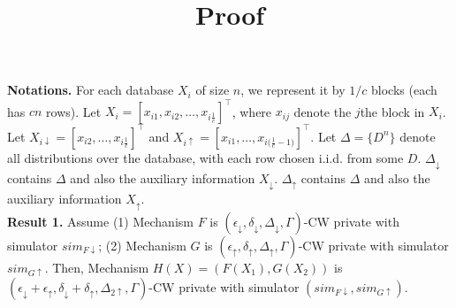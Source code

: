 \documentclass[11pt]{article}
\title{Proof}
\date{}
\begin{document}
\maketitle

{\bf Notations.} For each database $X_{i}$ of size $n$, we represent it by $1/c$ blocks (each has $cn$ rows). Let $X_{i}= [x_{i1},x_{i2}, \dots , x_{i \frac{1}{c}}]^{\top}$, where $x_{ij}$ denote the $j$the block in $X_{i}$. Let $X_{i \downarrow} = [x_{i2}, \dots , x_{i \frac{1}{c}}]^{\top}$ and $X_{i \uparrow} = [x_{i1}, \dots , x_{i {(\frac{1}{c}}-1)}]^{\top}$. Let $\Delta =\{D^{n}\}$ denote all distributions over the database, with each row chosen i.i.d. from some $D$. $\Delta_{\downarrow}$ contains $\Delta$ and also the auxiliary information $X_{ \downarrow}$. $\Delta_{\uparrow}$ contains $\Delta$ and also the auxiliary information $X_{ \uparrow}$.
\\ 

{\bf Result 1. } Assume (1) Mechanism $F$ is $(\epsilon_{\downarrow}, \delta_{\downarrow}, \Delta_{\downarrow}, \Gamma)$-CW private with simulator $sim_{F\downarrow}$; (2) Mechanism $G$ is $(\epsilon_{\uparrow}, \delta_{\uparrow}, \Delta_{\uparrow}, \Gamma)$-CW private with simulator $sim_{G\uparrow}$.
Then, Mechanism $H(X) = (F(X_{1}), G(X_{2}))$ is $(\epsilon_{\downarrow}+\epsilon_{\uparrow}, \delta_{\downarrow}+\delta_{\uparrow}, \Delta_{2\uparrow}, \Gamma)$-CW private with simulator $(sim_{F\downarrow}, sim_{G\uparrow})$.
\end{document}
